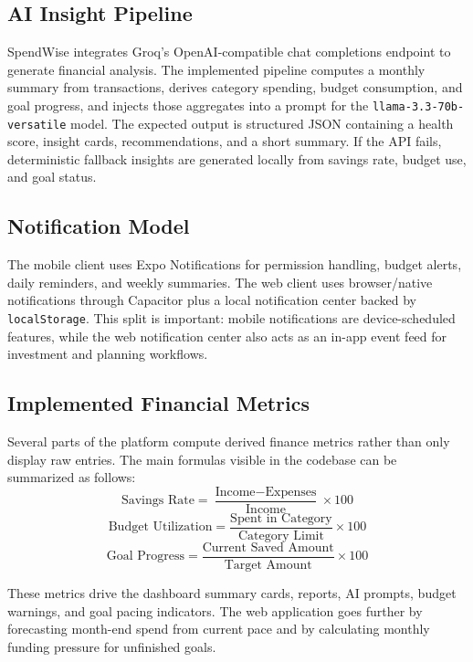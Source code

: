 \documentclass[conference]{IEEEtran}
\begin{document}
\subsection{AI Insight Pipeline}
SpendWise integrates Groq's OpenAI-compatible chat completions endpoint to generate financial analysis. The implemented pipeline computes a monthly summary from transactions, derives category spending, budget consumption, and goal progress, and injects those aggregates into a prompt for the \texttt{llama-3.3-70b-versatile} model. The expected output is structured JSON containing a health score, insight cards, recommendations, and a short summary. If the API fails, deterministic fallback insights are generated locally from savings rate, budget use, and goal status.

\subsection{Notification Model}
The mobile client uses Expo Notifications for permission handling, budget alerts, daily reminders, and weekly summaries. The web client uses browser/native notifications through Capacitor plus a local notification center backed by \texttt{localStorage}. This split is important: mobile notifications are device-scheduled features, while the web notification center also acts as an in-app event feed for investment and planning workflows.

\subsection{Implemented Financial Metrics}
Several parts of the platform compute derived finance metrics rather than only display raw entries. The main formulas visible in the codebase can be summarized as follows:
\begin{equation}
\text{Savings Rate} = \frac{\text{Income} - \text{Expenses}}{\text{Income}} \times 100
\end{equation}
\begin{equation}
\text{Budget Utilization} = \frac{\text{Spent in Category}}{\text{Category Limit}} \times 100
\end{equation}
\begin{equation}
\text{Goal Progress} = \frac{\text{Current Saved Amount}}{\text{Target Amount}} \times 100
\end{equation}

These metrics drive the dashboard summary cards, reports, AI prompts, budget warnings, and goal pacing indicators. The web application goes further by forecasting month-end spend from current pace and by calculating monthly funding pressure for unfinished goals.
\end{document}
